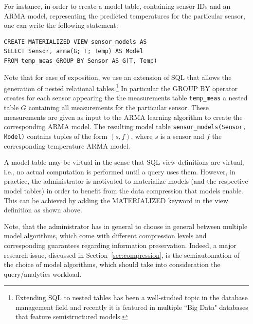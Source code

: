 \vspace*{0.5cm}
\begin{example}
\label{xmpl:models-and-definitions}
For instance, in order to create a model table, containing sensor IDs and an ARMA model, representing the predicted temperatures for the particular sensor, one can write the following statement:

\begin{verbatim}
CREATE MATERIALIZED VIEW sensor_models AS 
SELECT Sensor, arma(G; T; Temp) AS Model
FROM temp_meas GROUP BY Sensor AS G(T, Temp)
\end{verbatim}

Note that for ease of exposition, we use an extension of SQL that allows the generation of nested relational tables.\footnote{Extending SQL to nested tables has been a well-studied topic in the database management field and recently it is featured in multiple ``Big Data" databases that feature semistructured models. 
}
In particular the GROUP BY operator creates for each sensor appearing the the measurements table \texttt{temp\_meas} a nested table $G$ containing all measurements for the particular sensor. These measurements are given as input to the ARMA learning algorithm to create the corresponding ARMA model.
The resulting model table \texttt{sensor\_models(Sensor, Model)} contains tuples of the form $(s, f)$, where $s$ is a sensor and $f$ the corresponding temperature ARMA model.
\end{example}
\vspace*{0.5cm}

A model table may be virtual in the sense that SQL view definitions are virtual, i.e., no actual computation is performed until a query uses them. However, in practice, the administrator is motivated to materialize models (and the  respective model tables) in order to benefit from the data compression that models enable. This can be achieved by adding the MATERIALIZED keyword in the view definition as shown above.

Note, that the administrator has in general to choose in general between multiple model algorithms, which come with different compression levels and corresponding guarantees regarding information preservation. Indeed, a major research issue, discussed in Section~\ref{sec:compression}, is the semiautomation of the choice of model algorithms, which should take into consideration the query/analytics workload.

